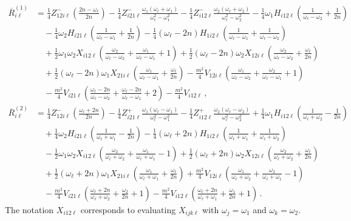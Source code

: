 \documentclass[letterpaper,11pt]{article}
\newcommand{\ol}{\omega_\ell}
\newcommand{\oone}{\omega_1}
\newcommand{\otwo}{\omega_2}
\begin{document}
\begin{align}
\overline{R}^{(1)}_{i \ell} &= \frac{1}{4} Z^{-}_{12i\ell} \left( \frac{2n - \ol}{2n} \right) - \frac{1}{4} Z^{-}_{i21\ell} \frac{\oone(\ol + \oone)}{\ol^2 - \oone^2} - \frac{1}{4} Z^{-}_{i12\ell} \frac{\otwo (\ol + \otwo)}{\ol^2 - \otwo^2} - \frac{1}{4}  \oone H_{i12\ell} \left( \frac{1}{\ol - \otwo} + \frac{1}{2n} \right) \nonumber \\
%
& \quad - \frac{1}{4} \otwo H_{i21\ell} \left( \frac{1}{\ol - \oone} + \frac{1}{2n} \right) - \frac{1}{4} (\ol - 2n) H_{1i2\ell} \left( \frac{1}{\ol - \oone} + \frac{1}{\ol - \otwo} \right) \nonumber \\
%
& \quad + \frac{1}{2} \oone \otwo X_{i12\ell} \left( \frac{\otwo}{\ol - \otwo} + \frac{\oone}{\ol - \oone} + 1 \right) + \frac{1}{2} (\ol - 2n) \otwo X_{12i\ell} \left( \frac{\otwo}{\ol - \otwo} + \frac{\ol}{2n} \right) \nonumber \\
%
& \quad + \frac{1}{2} (\ol - 2n) \oone X_{21i\ell} \left( \frac{\oone}{\ol - \oone} + \frac{\ol}{2n} \right) - \frac{m^2}{4} V_{12i\ell} \left( \frac{\oone}{\ol - \otwo} + \frac{\otwo}{\ol - \oone} + 1 \right) \nonumber \\
%
& \quad - \frac{m^2}{4} V_{i21\ell} \left( \frac{\ol - 2n}{\ol - \otwo} + \frac{\ol - 2n}{\ol - \oone} + 2 \right) - \frac{m^2}{4} V_{i12\ell} \, ,
\end{align}
\begin{align}
\overline{R}^{(2)}_{i \ell} &= \frac{1}{4} Z^{-}_{12i\ell} \left(\frac{\ol + 2n}{2n} \right) - \frac{1}{4} Z^{+}_{i 21\ell} \frac{\oone (\ol - \oone)}{\ol^2 - \oone^2} - \frac{1}{4} Z^{+}_{i12\ell} \frac{\otwo (\ol - \otwo)}{\ol^2 - \otwo^2} + \frac{1}{4} \oone H_{i12\ell} \left( \frac{1}{\ol + \otwo} - \frac{1}{2n} \right) \nonumber \\
%
& \quad + \frac{1}{4} \otwo H_{i21\ell} \left( \frac{1}{\ol + \oone} - \frac{1}{2n} \right) - \frac{1}{4} (\ol + 2n) H_{1i2\ell} \left( \frac{1}{\ol + \oone} + \frac{1}{\ol + \otwo} \right) \nonumber \\
%
& \quad - \frac{1}{2} \oone \otwo X_{i12\ell} \left( \frac{\otwo}{\ol + \otwo} + \frac{\oone}{\ol + \oone} - 1 \right) + \frac{1}{2} (\ol + 2n) \otwo X_{12i \ell} \left( \frac{\otwo}{\ol + \otwo} + \frac{\ol}{2n} \right) \nonumber \\
%
& \quad + \frac{1}{2} (\ol + 2n) \oone X_{21i\ell} \left( \frac{\oone}{\ol + \oone} + \frac{\ol}{2n} \right) + \frac{m^2}{4} V_{12i\ell} \left( \frac{\oone}{\ol + \otwo} + \frac{\otwo}{\ol + \oone} -1 \right) \nonumber \\
%
& \quad - \frac{m^2}{4} V_{i21\ell} \left( \frac{\ol + 2n}{\ol + \otwo} + \frac{\otwo}{2n} + 1\right) - \frac{m^2}{4} V_{i12\ell} \left( \frac{\ol + 2n}{\ol + \oone} + \frac{\oone}{2n} + 1 \right) \, .
\end{align}
The notation $X_{i12\ell}$ corresponds to evaluating $X_{ijk\ell}$ with $\omega_j = \oone$ and $\omega_k = \otwo$.
\end{document}
